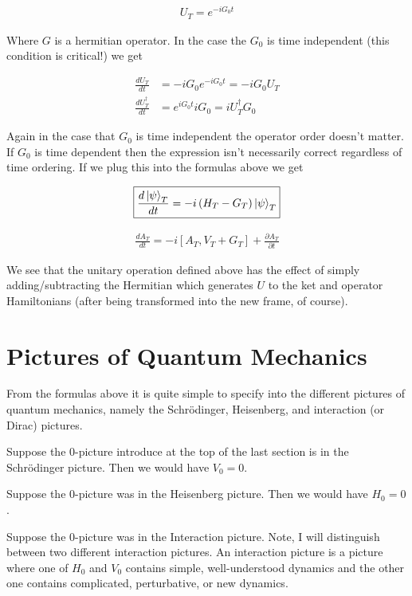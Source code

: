 \documentclass[12pt]{article}
\newcommand{\ddt}[1]{\frac{d #1}{dt}}
\begin{document}
\begin{align}
U_T = e^{-i G_0 t}
\end{align}

Where $G$ is a hermitian operator. In the case the $G_0$ is time independent (this condition is critical!) we get

\begin{align}
\ddt{U_T} &= -iG_0 e^{-iG_0t} = -iG_0 U_T\\
\ddt{U_T^{\dag}} &= e^{iG_0t} iG_0 = iU_T^{\dag} G_0
\end{align}

Again in the case that $G_0$ is time independent the operator order doesn't matter. If $G_0$ is time dependent then the expression isn't necessarily correct regardless of time ordering. If we plug this into the formulas above we get

\begin{align}
\boxed{\ddt{\ket{\psi}_T} = -i \left(H_T - G_T \right) \ket{\psi}_T}
\end{align}

\begin{align}
\boxed{
	\ddt{A_T} = -i\left[A_T, V_T + G_T \right] + \frac{\partial A_T}{\partial t}
}
\end{align}

We see that the unitary operation defined above has the effect of simply adding/subtracting the Hermitian which generates $U$ to the ket and operator Hamiltonians (after being transformed into the new frame, of course).

\section{Pictures of Quantum Mechanics}

From the formulas above it is quite simple to specify into the different pictures of quantum mechanics, namely the Schr{\"o}dinger, Heisenberg, and interaction (or Dirac) pictures.

Suppose the $0$-picture introduce at the top of the last section is in the Schr{\"o}dinger picture. Then we would have $V_0=0$. 

Suppose the $0$-picture was in the Heisenberg picture. Then we would have $H_0=0$.

Suppose the $0$-picture was in the Interaction picture. Note, I will distinguish between two different interaction pictures. An interaction picture is a picture where one of $H_0$ and $V_0$ contains simple, well-understood dynamics and the other one contains complicated, perturbative, or new dynamics. 
\end{document}
